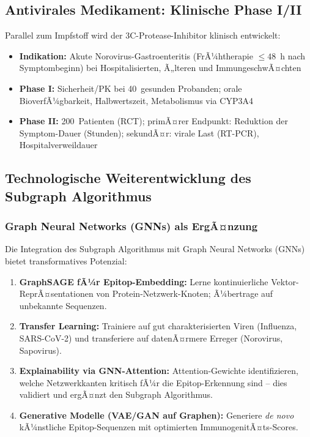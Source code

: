 ﻿\documentclass[a4paper,12pt]{article}
\theoremstyle{plain}
\theoremstyle{definition}
\theoremstyle{remark}
\begin{document}
\subsection{Antivirales Medikament: Klinische Phase I/II}

Parallel zum Impfstoff wird der 3C-Protease-Inhibitor klinisch entwickelt:

\begin{itemize}
  \item \textbf{Indikation:} Akute Norovirus-Gastroenteritis (FrÃ¼htherapie $\leq48$~h
        nach Symptombeginn) bei Hospitalisierten, Ã„lteren und ImmungeschwÃ¤chten
  \item \textbf{Phase I:} Sicherheit/PK bei 40~gesunden Probanden; orale BioverfÃ¼gbarkeit,
        Halbwertszeit, Metabolismus via CYP3A4
  \item \textbf{Phase II:} 200~Patienten (RCT); primÃ¤rer Endpunkt: Reduktion der
        Symptom-Dauer (Stunden); sekundÃ¤r: virale Last (RT-PCR), Hospitalverweildauer
\end{itemize}

\subsection{Technologische Weiterentwicklung des Subgraph Algorithmus}

\subsubsection{Graph Neural Networks (GNNs) als ErgÃ¤nzung}

Die Integration des Subgraph Algorithmus mit Graph Neural Networks (GNNs) bietet
transformatives Potenzial:

\begin{enumerate}
  \item \textbf{GraphSAGE fÃ¼r Epitop-Embedding:} Lerne kontinuierliche Vektor-ReprÃ¤sentationen
        von Protein-Netzwerk-Knoten; Ã¼bertrage auf unbekannte Sequenzen.
  \item \textbf{Transfer Learning:} Trainiere auf gut charakterisierten Viren
        (Influenza, SARS-CoV-2) und transferiere auf datenÃ¤rmere Erreger (Norovirus,
        Sapovirus).
  \item \textbf{Explainability via GNN-Attention:} Attention-Gewichte identifizieren,
        welche Netzwerkkanten kritisch fÃ¼r die Epitop-Erkennung sind -- dies validiert
        und ergÃ¤nzt den Subgraph Algorithmus.
  \item \textbf{Generative Modelle (VAE/GAN auf Graphen):} Generiere \textit{de novo}
        kÃ¼nstliche Epitop-Sequenzen mit optimierten ImmunogenitÃ¤ts-Scores.
\end{enumerate}
\end{document}
